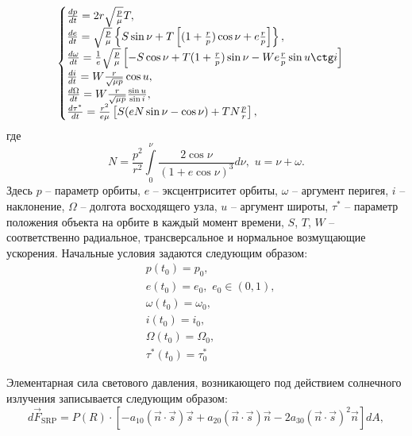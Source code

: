 \begin{equation}
  \begin{cases}
    \frac{dp}{dt} = 2r\sqrt{\frac{p}{\mu}}T, \\
    \frac{de}{dt} = \sqrt{\frac{p}{\mu}}\left\{
      S\sin\nu + T\left[(1 + \frac{r}{p})\cos\nu + e\frac{r}{p}\right]
    \right\}, \\
    \frac{d\omega}{dt} = \frac{1}{e}\sqrt{\frac{p}{\mu}}\left[
      -S\cos\nu + T(1 + \frac{r}{p})\sin\nu - W e\frac{r}{p}\sin u\ctg i
    \right] \\
    \frac{di}{dt} = W \frac{r}{\sqrt{\mu p}}\cos u, \\
    \frac{d\Omega}{dt} = W \frac{r}{\sqrt{\mu p}}\frac{\sin u}{\sin i}, \\
    \frac{d\tau^*}{dt} = \frac{r^2}{e\mu}\left[
      S (eN\sin\nu - \cos\nu) + T N\frac{p}{r}
    \right],
  \end{cases}
\end{equation}
где
\begin{equation}
  N = \frac{p^2}{r^2}\int\limits_0^{\nu} \frac{2\cos\nu}{(1 + e\cos\nu)^3}d\nu,\,\,
  u = \nu + \omega.
\end{equation}
Здесь $p$ -- параметр орбиты, $e$ -- эксцентриситет орбиты, $\omega$ -- аргумент
перигея, $i$ -- наклонение, $\Omega$ -- долгота восходящего узла, $u$ -- аргумент
широты, $\tau^*$ -- параметр положения объекта на орбите в каждый момент времени,
$S$, $T$, $W$ -- соответственно радиальное, трансверсальное и нормальное возмущающие
ускорения.
Начальные условия задаются следующим образом:
\begin{equation}
\begin{aligned}
    & p(t_0) = p_0, \\
    & e(t_0) = e_0,\,\, e_0 \in (0, 1), \\
    & \omega(t_0) = \omega_0, \\
    & i(t_0) = i_0, \\
    & \Omega(t_0) = \Omega_0, \\
    & \tau^*(t_0) = \tau^*_0
\end{aligned}
\end{equation}\par
    Элементарная сила светового давления, возникающего под действием солнечного излучения записывается
следующим образом:
\begin{equation}
  d\vec{F}_{\text{SRP}} = P(R) \cdot \left[
    -a_{10}(\vec{n}\cdot\vec{s})\vec{s}
    +a_{20}(\vec{n}\cdot\vec{s})\vec{n}
    -2a_{30}(\vec{n}\cdot\vec{s})^2\vec{n}
  \right]dA,
\end{equation}

